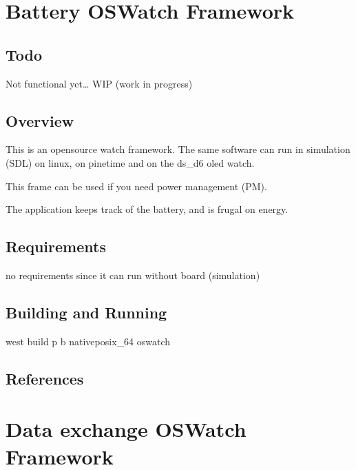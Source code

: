 \documentclass[letterpaper,10pt,english]{sphinxmanual}
\begin{document}
\section{Battery OSWatch Framework}
\label{\detokenize{samples/apposwatch-batteryREADME:battery-oswatch-framework}}\label{\detokenize{samples/apposwatch-batteryREADME:oswatch}}\label{\detokenize{samples/apposwatch-batteryREADME::doc}}

\subsection{Todo}
\label{\detokenize{samples/apposwatch-batteryREADME:todo}}
Not functional yet…
WIP (work in progress)


\subsection{Overview}
\label{\detokenize{samples/apposwatch-batteryREADME:overview}}
This is an opensource watch framework.
The same software can run in simulation (SDL) on linux, on pinetime and on the ds\_d6 oled watch.

This frame can be used if you need power management (PM).

The application keeps track of the battery, and is frugal on energy.


\subsection{Requirements}
\label{\detokenize{samples/apposwatch-batteryREADME:requirements}}
no requirements since it can run without board (simulation)


\subsection{Building and Running}
\label{\detokenize{samples/apposwatch-batteryREADME:building-and-running}}
west build \sphinxhyphen{}p \sphinxhyphen{}b  native\sphinxhyphen{}posix\_64 oswatch


\subsection{References}
\label{\detokenize{samples/apposwatch-batteryREADME:references}}

\section{Data exchange   OSWatch Framework}
\label{\detokenize{samples/apposwatch-btREADME:data-exchange-oswatch-framework}}\label{\detokenize{samples/apposwatch-btREADME:oswatch}}\label{\detokenize{samples/apposwatch-btREADME::doc}}
\end{document}
